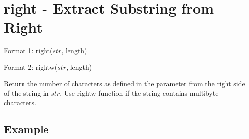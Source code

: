 %

\section{right - Extract Substring from Right\label{sect:right}}

Format 1: right($str$, length)

Format 2: rightw($str$, length)

Return the number of characters as defined in the parameter from the right side of the string in $str$. Use rightw function if the string contains multibyte characters. 

\subsection*{Example}


%

